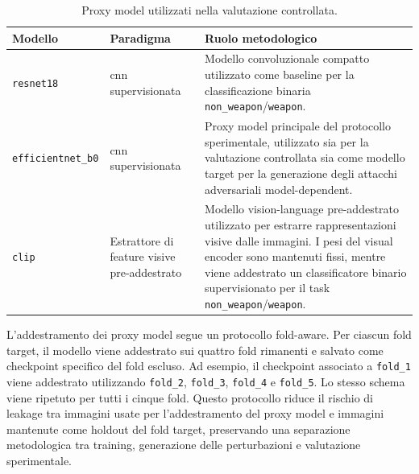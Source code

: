 \begin{table}[H]
\centering
\caption{Proxy model utilizzati nella valutazione controllata.}
\label{tab:methodology-proxy-models}
\begin{tabularx}{\textwidth}{@{}l l X@{}}
\toprule
\textbf{Modello} & \textbf{Paradigma} & \textbf{Ruolo metodologico} \\
\midrule

\texttt{resnet18}
&
\gls{cnn} supervisionata
&
Modello convoluzionale compatto utilizzato come baseline per la classificazione
binaria \texttt{non\_weapon}/\texttt{weapon}. \\

\texttt{efficientnet\_b0}
&
\gls{cnn} supervisionata
&
Proxy model principale del protocollo sperimentale, utilizzato sia per la
valutazione controllata sia come modello target per la generazione degli attacchi
adversariali model-dependent. \\

\texttt{clip}
&
Estrattore di feature visive pre-addestrato
&
Modello vision-language pre-addestrato utilizzato per estrarre rappresentazioni
visive dalle immagini. I pesi del visual encoder sono mantenuti fissi, mentre
viene addestrato un classificatore binario supervisionato per il task
\texttt{non\_weapon}/\texttt{weapon}. \\

\bottomrule
\end{tabularx}
\end{table}




L'addestramento dei proxy model segue un protocollo fold-aware. Per ciascun
fold target, il modello viene addestrato sui quattro fold rimanenti e salvato
come checkpoint specifico del fold escluso. Ad esempio, il checkpoint associato
a \texttt{fold\_1} viene addestrato utilizzando \texttt{fold\_2},
\texttt{fold\_3}, \texttt{fold\_4} e \texttt{fold\_5}. Lo stesso schema viene
ripetuto per tutti i cinque fold. Questo protocollo riduce il rischio di leakage tra immagini usate per
l'addestramento del proxy model e immagini mantenute come holdout del fold
target, preservando una separazione metodologica tra training, generazione delle
perturbazioni e valutazione sperimentale.


